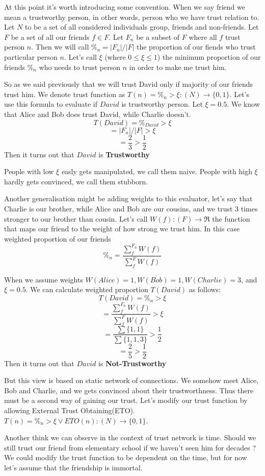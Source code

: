 \documentclass[nostrict]{szablonPG}
\begin{document}
At this point it's worth introducing some convention. When we say friend we mean a trustworthy person, in other words, person who we have trust relation to. Let $N$ to be a set of all considered individuals group, friends and non-friends. Let $F$ be a set of all our friends $f \in F$. Let $F_n$ be a subset of $F$ where all $f$ trust person $n$. Then we will call $\%_n = |F_n|/|F|$ the proportion of our fiends who trust particular person $n$. Let's call $\xi$ (where $0 \le \xi \leq 1$) the minimum proportion of our friends $\%_n$ who needs to trust person $n$ in order to make me trust him. 

So as we said previously that we will trust David only if majority of our friends trust him. We denote trust function as $T(n) = \%_n > \xi : (N) \rightarrow \{0,1\}$. 
Let's use this formula to evaluate if $David$ is trustworthy person. Let $\xi = 0.5$. We know that Alice and Bob does trust David, while Charlie doesn't.
\[T(David) = \%_{David} > \xi\]
\[= |F_n|/|F| > \xi\]
\[= \frac{2}{3} > \frac{1}{2}\]
Then it turns out that $David$ is \textbf{Trustworthy}


People with low $\xi$ easly gets manipulated, we call them naive.
People with high $\xi$ hardly gets convinced, we call them stubborn. 

Another generalisation might be adding weights to this evaluator, let's say that Charlie is our brother, while Alice and Bob are our cousins, and we trust 3 times stronger to our brother than cousin. Let's call $W(f): (F) \rightarrow \Re$ the function that maps our friend to the weight of how strong we trust him. In this case weighted proportion of our friends \[\%_n = \frac{\sum\limits_f^{F_n} W(f)}{\sum\limits_f^{F} W(f)}\]

When we assume weights $W(Alice) = 1, W(Bob) = 1, W(Charlie) = 3$, and $\xi = 0.5$. We can calculate weighted proportion $T(David)$ as follows:
\[T(David) = \%_n > \xi\]
\[= \frac{\sum\limits_f^{F_n} W(f)}{\sum\limits_f^{F} W(f)} > \xi\]
\[= \frac{\sum \{1,1\}}{\sum\{1,1,3\}} > \frac{1}{2}\]
\[= \frac{2}{5} > \frac{1}{2}\]
Then it turns out that $David$ is \textbf{Not-Trustworthy}

But this view is based on static network of connections. We somehow meet Alice, Bob and Charlie, and we gets convinced about their trustworthness. Thus there must be a second way of gaining our trust. Let's modify our trust function by allowing External Trust Obtaining(ETO). $T(n) = \%_n > \xi \lor ETO(n) : (N) \rightarrow \{0,1\}$.

Another think we can observe in the context of trust network is time. Should we still trust our friend from elementary school if we haven't seen him for decades ? We could modify the trust function to be dependent on the time, but for now let's assume that the friendship is immortal.
\end{document}

